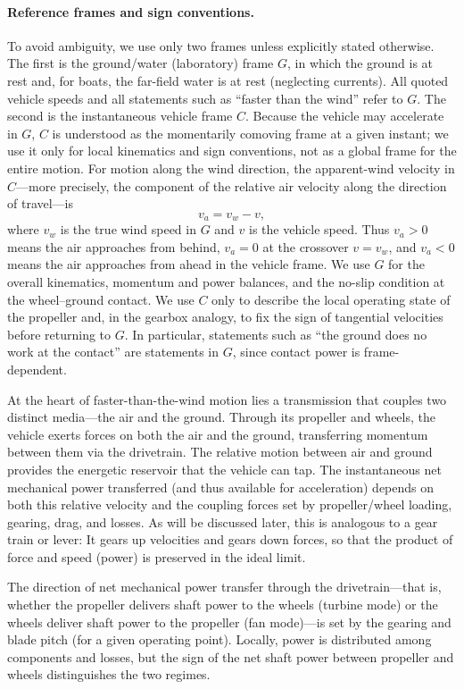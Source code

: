 \documentclass[a4paper]{article}
\begin{document}
\paragraph*{Reference frames and sign conventions.}
To avoid ambiguity, we use only two frames unless explicitly stated otherwise.
The first is the ground/water (laboratory) frame \(G\), in which the ground is
at rest and, for boats, the far-field water is at rest (neglecting currents).
All quoted vehicle speeds and all statements such as ``faster than the wind''
refer to \(G\). The second is the instantaneous vehicle frame \(C\). Because
the vehicle may accelerate in \(G\), \(C\) is understood as the momentarily
comoving frame at a given instant; we use it only for local kinematics and sign
conventions, not as a global frame for the entire motion. For motion along the
wind direction, the apparent-wind velocity in \(C\)---more precisely, the
component of the relative air velocity along the direction of travel---is
\[
v_a = v_w - v,
\]
where \(v_w\) is the true wind speed in \(G\) and \(v\) is the vehicle speed.
Thus \(v_a>0\) means the air approaches from behind, \(v_a=0\) at the crossover
\(v=v_w\), and \(v_a<0\) means the air approaches from ahead in the vehicle
frame. We use \(G\) for the overall kinematics, momentum and power balances,
and the no-slip condition at the wheel--ground contact. We use \(C\) only to
describe the local operating state of the propeller and, in the gearbox
analogy, to fix the sign of tangential velocities before returning to \(G\). In
particular, statements such as ``the ground does no work at the contact'' are
statements in \(G\), since contact power is frame-dependent.

At the heart of faster-than-the-wind motion lies a transmission that couples two distinct media---the air and the ground.
Through its propeller and wheels, the vehicle exerts forces on both the air
and the ground, transferring momentum between them via the drivetrain. The relative motion between air and ground provides the energetic reservoir that the vehicle can tap. The instantaneous net mechanical power transferred (and thus available for acceleration) depends on both this relative velocity and the coupling forces set by propeller/wheel loading, gearing, drag, and losses.
As will be discussed later, this is analogous to a gear train or lever: It gears up velocities and gears down forces, so that the product of force and speed (power) is preserved in the ideal limit.

The direction of net mechanical power transfer through the drivetrain---that is, whether the propeller delivers shaft power to the wheels (turbine mode) or the wheels deliver shaft power to the propeller (fan mode)---is set by the gearing and blade pitch (for a given operating point).
Locally, power is distributed among components and losses, but the sign of the net shaft power between propeller and wheels distinguishes the two regimes.
\end{document}
